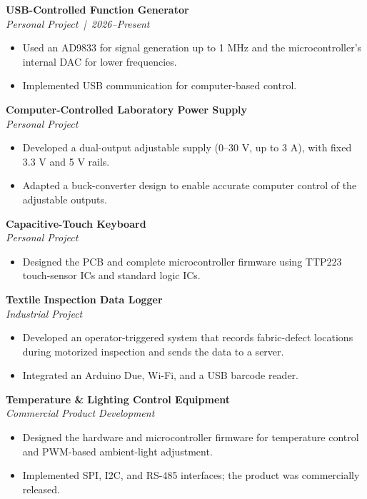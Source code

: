 \documentclass[10pt,a4paper,ragged2e]{altacv}
\begin{document}
\textbf{USB-Controlled Function Generator}\\
\textit{Personal Project \,|\, 2026--Present}
\begin{itemize}
  \item Used an AD9833 for signal generation up to 1 MHz and the microcontroller's
        internal DAC for lower frequencies.
  \item Implemented USB communication for computer-based control.
\end{itemize}
\divider

\textbf{Computer-Controlled Laboratory Power Supply}\\
\textit{Personal Project}
\begin{itemize}
  \item Developed a dual-output adjustable supply (0--30 V, up to 3 A), with fixed
        3.3 V and 5 V rails.
  \item Adapted a buck-converter design to enable accurate computer control of the
        adjustable outputs.
\end{itemize}
\divider

\textbf{Capacitive-Touch Keyboard}\\
\textit{Personal Project}
\begin{itemize}
  \item Designed the PCB and complete microcontroller firmware using TTP223
        touch-sensor ICs and standard logic ICs.
\end{itemize}
\divider

\textbf{Textile Inspection Data Logger}\\
\textit{Industrial Project}
\begin{itemize}
  \item Developed an operator-triggered system that records fabric-defect locations
        during motorized inspection and sends the data to a server.
  \item Integrated an Arduino Due, Wi-Fi, and a USB barcode reader.
\end{itemize}
\divider

\textbf{Temperature \& Lighting Control Equipment}\\
\textit{Commercial Product Development}
\begin{itemize}
  \item Designed the hardware and microcontroller firmware for temperature control and
        PWM-based ambient-light adjustment.
  \item Implemented SPI, I2C, and RS-485 interfaces; the product was commercially released.
\end{itemize}
\end{document}
